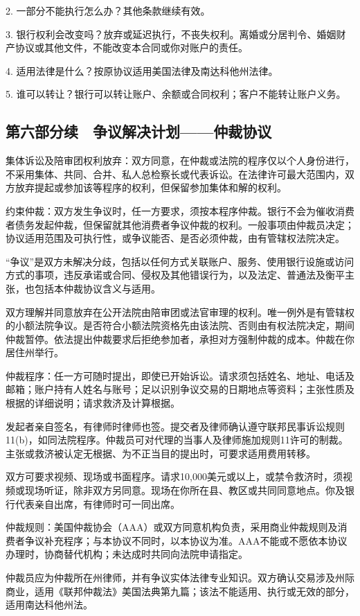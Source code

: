 \documentclass[UTF8,fontset=none,11pt,a4paper]{ctexart}
\begin{document}
2. 一部分不能执行怎么办？其他条款继续有效。


3. 银行权利会改变吗？放弃或延迟执行，不丧失权利。离婚或分居判令、婚姻财产协议或其他文件，不能改变本合同或你对账户的责任。


4. 适用法律是什么？按原协议适用美国法律及南达科他州法律。


5. 谁可以转让？银行可以转让账户、余额或合同权利；客户不能转让账户义务。


\subsection*{第六部分续　争议解决计划——仲裁协议}
集体诉讼及陪审团权利放弃：双方同意，在仲裁或法院的程序仅以个人身份进行，不采用集体、共同、合并、私人总检察长或代表诉讼。在法律许可最大范围内，双方放弃提起或参加该等程序的权利，但保留参加集体和解的权利。


约束仲裁：双方发生争议时，任一方要求，须按本程序仲裁。银行不会为催收消费者债务发起仲裁，但保留就其他消费者争议仲裁的权利。一般事项由仲裁员决定；协议适用范围及可执行性，或争议能否、是否必须仲裁，由有管辖权法院决定。


“争议”是双方未解决分歧，包括以任何方式关联账户、服务、使用银行设施或访问方式的事项，违反承诺或合同、侵权及其他错误行为，以及法定、普通法及衡平主张，也包括本仲裁协议含义与适用。


双方理解并同意放弃在公开法院由陪审团或法官审理的权利。唯一例外是有管辖权的小额法院争议。是否符合小额法院资格先由该法院、否则由有权法院决定，期间仲裁暂停。依法提出仲裁要求后拒绝参加者，承担对方强制仲裁的成本。仲裁在你居住州举行。


仲裁程序：任一方可随时提出，即使已开始诉讼。请求须包括姓名、地址、电话及邮箱；账户持有人姓名与账号；足以识别争议交易的日期地点等资料；主张性质及根据的详细说明；请求救济及计算根据。


发起者亲自签名，有律师时律师也签。提交者及律师确认遵守联邦民事诉讼规则11(b)，如同法院程序。仲裁员可对代理的当事人及律师施加规则11许可的制裁。主张或救济被认定无根据、为不正当目的提出时，可要求适用费用转移。


双方可要求视频、现场或书面程序。请求10,000美元或以上，或禁令救济时，须视频或现场听证，除非双方另同意。现场在你所在县、教区或共同同意地点。你及银行代表亲自出席，有律师时可一同出席。


仲裁规则：美国仲裁协会（AAA）或双方同意机构负责，采用商业仲裁规则及消费者争议补充程序；与本协议不同时，以本协议为准。AAA不能或不愿依本协议办理时，协商替代机构；未达成时共同向法院申请指定。


仲裁员应为仲裁所在州律师，并有争议实体法律专业知识。双方确认交易涉及州际商业，适用《联邦仲裁法》美国法典第九篇；该法不能适用、执行或无效的部分，适用南达科他州法。
\end{document}
